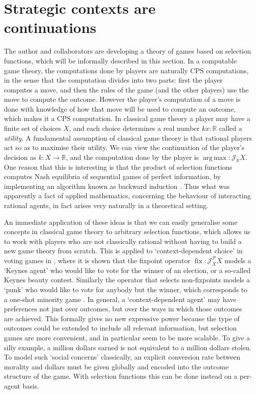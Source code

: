 \documentclass{article}
\newcommand\R{\mathbb R}
\newcommand\J{\mathscr J}
\newcommand\argmax{\operatorname{arg\,max}}
\begin{document}
\section{Strategic contexts are continuations}\label{games1}


The author and collaborators are developing a theory of games based on selection functions, which will be informally described in this section. In a computable game theory, the computations done by players are naturally CPS computations, in the sense that the computation divides into two parts: first the player computes a move, and then the rules of the game (and the other players) use the move to compute the outcome. However the player's computation of a move is done with knowledge of how that move will be used to compute an outcome, which makes it a CPS computation. In classical game theory a player may have a finite set of choices $X$, and each choice determines a real number $kx : \R$ called a \emph{utility}. A fundamental assumption of classical game theory is that rational players act so as to maximise their utility. We can view the continuation of the player's decision as $k : X \to \R$, and the computation done by the player is $\argmax : \J_\R X$. One reason that this is interesting is that the product of selection functions computes Nash equilibria of sequential games of perfect information, by implementing an algorithm known as backward induction \citep{escardo12}. Thus what was apparently a fact of applied mathematics, concerning the behaviour of interacting rational agents, in fact arises very naturally in a theoretical setting.

An immediate application of these ideas is that we can easily generalise some concepts in classical game theory to arbitrary selection functions, which allows us to work with players who are not classically rational without having to build a new game theory from scratch. This is applied to `context-dependent choice' in voting games in \citep{hedges14c}, where it is shown that the fixpoint operator $\operatorname{fix} : \J^\mathcal P_X X$ models a `Keynes agent' who would like to vote for the winner of an election, or a so-called Keynes beauty contest. Similarly the operator that selects non-fixpoints models a `punk' who would like to vote for anybody but the winner, which corresponds to a one-shot minority game \citep{kets11}. In general, a `context-dependent agent' may have preferences not just over outcomes, but over the ways in which those outcomes are achieved. This formally gives no new expressive power because the type of outcomes could be extended to include all relevant information, but selection games are more convenient, and in particular seem to be more scalable. To give a silly example, a million dollars earned is not equivalent to a million dollars stolen. To model such `social concerns' classically, an explicit conversion rate between morality and dollars must be given globally and encoded into the outcome structure of the game. With selection functions this can be done instead on a per-agent basis.
\end{document}
